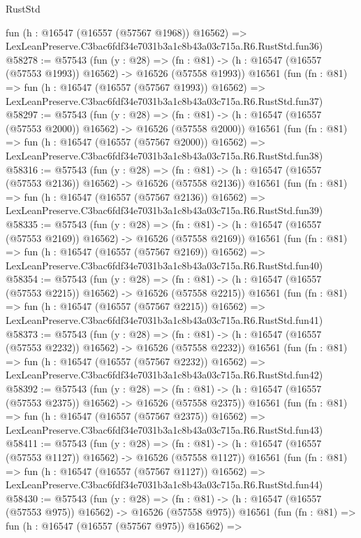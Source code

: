 \begin{lexlean}{RustStd}
\begin{coremodule}
    fun (h : @16547 (@16557 (@57567 @1968)) @16562) =>
    LexLeanPreserve.C3bac6fdf34e7031b3a1c8b43a03c715a.R6.RustStd.fun36)
@58278 := @57543
    (fun (y : @28) =>
    (fn : @81) -> (h : @16547 (@16557 (@57553 @1993)) @16562) -> @16526 (@57558 @1993))
    @16561
    (fun (fn : @81) =>
    fun (h : @16547 (@16557 (@57567 @1993)) @16562) =>
    LexLeanPreserve.C3bac6fdf34e7031b3a1c8b43a03c715a.R6.RustStd.fun37)
@58297 := @57543
    (fun (y : @28) =>
    (fn : @81) -> (h : @16547 (@16557 (@57553 @2000)) @16562) -> @16526 (@57558 @2000))
    @16561
    (fun (fn : @81) =>
    fun (h : @16547 (@16557 (@57567 @2000)) @16562) =>
    LexLeanPreserve.C3bac6fdf34e7031b3a1c8b43a03c715a.R6.RustStd.fun38)
@58316 := @57543
    (fun (y : @28) =>
    (fn : @81) -> (h : @16547 (@16557 (@57553 @2136)) @16562) -> @16526 (@57558 @2136))
    @16561
    (fun (fn : @81) =>
    fun (h : @16547 (@16557 (@57567 @2136)) @16562) =>
    LexLeanPreserve.C3bac6fdf34e7031b3a1c8b43a03c715a.R6.RustStd.fun39)
@58335 := @57543
    (fun (y : @28) =>
    (fn : @81) -> (h : @16547 (@16557 (@57553 @2169)) @16562) -> @16526 (@57558 @2169))
    @16561
    (fun (fn : @81) =>
    fun (h : @16547 (@16557 (@57567 @2169)) @16562) =>
    LexLeanPreserve.C3bac6fdf34e7031b3a1c8b43a03c715a.R6.RustStd.fun40)
@58354 := @57543
    (fun (y : @28) =>
    (fn : @81) -> (h : @16547 (@16557 (@57553 @2215)) @16562) -> @16526 (@57558 @2215))
    @16561
    (fun (fn : @81) =>
    fun (h : @16547 (@16557 (@57567 @2215)) @16562) =>
    LexLeanPreserve.C3bac6fdf34e7031b3a1c8b43a03c715a.R6.RustStd.fun41)
@58373 := @57543
    (fun (y : @28) =>
    (fn : @81) -> (h : @16547 (@16557 (@57553 @2232)) @16562) -> @16526 (@57558 @2232))
    @16561
    (fun (fn : @81) =>
    fun (h : @16547 (@16557 (@57567 @2232)) @16562) =>
    LexLeanPreserve.C3bac6fdf34e7031b3a1c8b43a03c715a.R6.RustStd.fun42)
@58392 := @57543
    (fun (y : @28) =>
    (fn : @81) -> (h : @16547 (@16557 (@57553 @2375)) @16562) -> @16526 (@57558 @2375))
    @16561
    (fun (fn : @81) =>
    fun (h : @16547 (@16557 (@57567 @2375)) @16562) =>
    LexLeanPreserve.C3bac6fdf34e7031b3a1c8b43a03c715a.R6.RustStd.fun43)
@58411 := @57543
    (fun (y : @28) =>
    (fn : @81) -> (h : @16547 (@16557 (@57553 @1127)) @16562) -> @16526 (@57558 @1127))
    @16561
    (fun (fn : @81) =>
    fun (h : @16547 (@16557 (@57567 @1127)) @16562) =>
    LexLeanPreserve.C3bac6fdf34e7031b3a1c8b43a03c715a.R6.RustStd.fun44)
@58430 := @57543
    (fun (y : @28) =>
    (fn : @81) -> (h : @16547 (@16557 (@57553 @975)) @16562) -> @16526 (@57558 @975))
    @16561
    (fun (fn : @81) =>
    fun (h : @16547 (@16557 (@57567 @975)) @16562) =>

\end{coremodule}
\end{lexlean}
